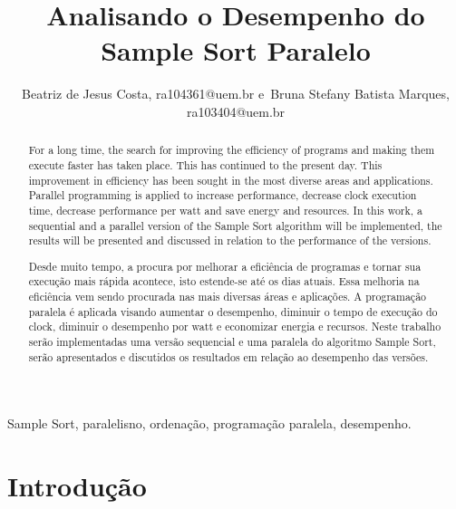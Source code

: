 \documentclass[journal]{IEEEtran}
\begin{document}
\title{Analisando o Desempenho do Sample Sort Paralelo}


\author{Beatriz de Jesus Costa,
        ra104361@uem.br
        e~Bruna Stefany Batista Marques, ra103404@uem.br
}





\maketitle


\begin{abstract}
For a long time, the search for improving the efficiency of programs and making them execute faster has taken place. This has continued to the present day. This improvement in efficiency has been sought in the most diverse areas and applications. Parallel programming is applied to increase performance, decrease clock execution time, decrease performance per watt and save energy and resources. In this work, a sequential and a parallel version of the Sample Sort algorithm will be implemented, the results will be presented and discussed in relation to the performance of the versions.
\end{abstract}

\def\abstractname{Resumo}
\begin{abstract}
Desde muito tempo, a procura por melhorar a eficiência de programas e tornar sua execução mais rápida acontece, isto estende-se até os dias atuais. Essa melhoria na eficiência vem sendo procurada nas mais diversas áreas e aplicações. A programação paralela é aplicada visando aumentar o desempenho, diminuir o tempo de execução do clock, diminuir o desempenho por watt e economizar energia e recursos. Neste trabalho serão implementadas uma versão sequencial e uma paralela do algoritmo Sample Sort, serão apresentados e discutidos os resultados em relação ao desempenho das versões.
\end{abstract}


\begin{IEEEkeywords}
  Sample Sort, paralelisno, ordenação, programação paralela, desempenho.
\end{IEEEkeywords}


\IEEEpeerreviewmaketitle



\section{Introdução}
\end{document}
